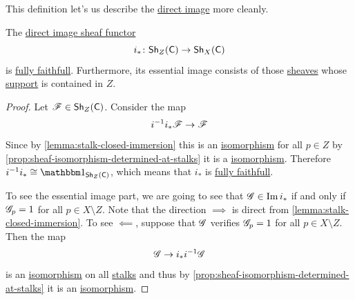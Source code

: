\documentclass[../../main]{subfiles}
\begin{document}
This definition let's us describe the \hyperref[def:direct-image-sheaf]{direct image} more cleanly.
\begin{proposition}\label{prop:closed-immersion-fully-faithful}
  The \hyperref[def:direct-image-sheaf]{direct image sheaf functor}
  \begin{equation*}
    i_{\ast}\colon \mathsf{Sh}_{Z}(\mathsf{C}) \to \mathsf{Sh}_{X}(\mathsf{C})
  \end{equation*}
  is \hyperref[def:functor-types]{fully faithfull}.
  Furthermore, its essential image consists of those \hyperref[def:sheaf]{sheaves} whose \hyperref[def:support-sheaf]{support} is contained in \(Z\).
\end{proposition}
\begin{proof}
  Let \(\mathscr{F} \in \mathsf{Sh}_{Z}(\mathsf{C})\).
  Consider the map
  \begin{equation*}
    i^{-1}i_{\ast}\mathscr{F} \to \mathscr{F}
  \end{equation*}
  Since by \autoref{lemma:stalk-closed-immersion} this is an \hyperref[def:categorical-isomorphism]{isomorphism} for all \(p \in Z\) by \autoref{prop:sheaf-isomorphism-determined-at-stalks} it is a \hyperref[def:categorical-isomorphism]{isomorphism}.
  Therefore \(i^{-1}i_{\ast} \cong \id_{\Sh_{Z}(\category{C})}\), which means that \(i_{\ast}\) is \hyperref[def:functor-types]{fully faithfull}.

  To see the essential image part, we are going to see that \(\mathscr{G} \in \operatorname{Im} i_{\ast}\) if and only if \(\mathscr{G}_{p} = 1\) for all \(p \in X \setminus Z\).
  Note that the direction \(\implies\) is direct from \autoref{lemma:stalk-closed-immersion}.
  To see \(\impliedby\), suppose that \(\mathscr{G}\) verifies \(\mathscr{G}_{p} = 1\) for all \(p \in X \setminus Z\).
  Then the map
  \begin{equation*}
    \mathscr{G} \to i_{\ast}i^{-1}\mathscr{G}
  \end{equation*}
  is an \hyperref[def:categorical-isomorphism]{isomorphism} on all \hyperref[def:stalk]{stalks} and thus by \autoref{prop:sheaf-isomorphism-determined-at-stalks} it is an \hyperref[def:categorical-isomorphism]{isomorphism}.
\end{proof}
\end{document}
